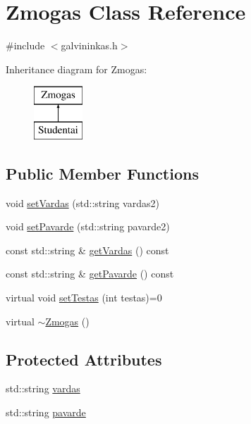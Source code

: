 \hypertarget{class_zmogas}{}\section{Zmogas Class Reference}
\label{class_zmogas}


{\ttfamily \#include $<$galvininkas.\+h$>$}

Inheritance diagram for Zmogas\+:\begin{figure}[H]
\begin{center}
\leavevmode
\includegraphics[height=2.000000cm]{class_zmogas}
\end{center}
\end{figure}
\subsection*{Public Member Functions}
\begin{DoxyCompactItemize}
\item 
void \mbox{\hyperlink{class_zmogas_a239a2dd985df7bb9a1003da4a4564d6a}{set\+Vardas}} (std\+::string vardas2)
\item 
void \mbox{\hyperlink{class_zmogas_a0f5cb4ac9fb479662d238a38ca45a233}{set\+Pavarde}} (std\+::string pavarde2)
\item 
const std\+::string \& \mbox{\hyperlink{class_zmogas_a32e2c97902e645d6d5fcea6c6f45e1e7}{get\+Vardas}} () const
\item 
const std\+::string \& \mbox{\hyperlink{class_zmogas_a3839c9438bc70a25c82bed34e56366c2}{get\+Pavarde}} () const
\item 
virtual void \mbox{\hyperlink{class_zmogas_aa51276c9b36f9a415dc32052b4ca048b}{set\+Testas}} (int testas)=0
\item 
virtual \mbox{\hyperlink{class_zmogas_ac2e2ca496b9478f7e87fc23450757ee6}{$\sim$\+Zmogas}} ()
\end{DoxyCompactItemize}
\subsection*{Protected Attributes}
\begin{DoxyCompactItemize}
\item 
std\+::string \mbox{\hyperlink{class_zmogas_ac0e6b532ffc7b13d40c5b8cd28510f35}{vardas}}
\item 
std\+::string \mbox{\hyperlink{class_zmogas_a3b5448e7b7d3d75623a5b942b2086686}{pavarde}}
\end{DoxyCompactItemize}



